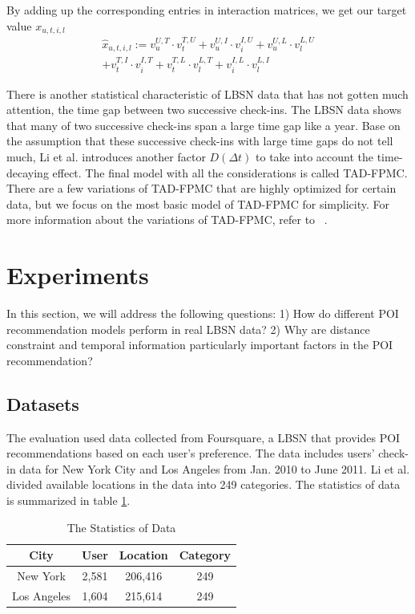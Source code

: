 \documentclass{sig-alternate}
\begin{document}
By adding up the corresponding entries in interaction matrices, we get our target value $x_{u,t,i,l}$
\begin{equation}
\begin{split}
\hat{x}_{u,t,i,l} := v_u^{U,T} \cdot v_t^{T,U} + v_u^{U,I} \cdot v_i^{I,U} + v_u^{U,L} \cdot v_l^{L,U}  \\
	                        + v_t^{T,I} \cdot v_i^{I,T} + v_t^{T,L} \cdot v_l^{L,T} + v_i^{I,L} \cdot v_l^{L,I}
\end{split}
\label{eq:TAD-FPMC}
\end{equation}

There is another statistical characteristic of LBSN data that has not gotten much attention, the time gap between 
two successive check-ins. The LBSN data shows that many of two successive check-ins span a large time gap 
like a year. Base on the assumption that these successive check-ins with large time gaps do not tell much, 
Li et al. \cite{Li:2017} introduces another factor $D(\Delta t)$ to take into account the time-decaying effect. 
The final model with all the considerations is called TAD-FPMC. There are a few variations of TAD-FPMC that 
are highly optimized for certain data, but we focus on the most basic model of TAD-FPMC for simplicity. 
For more information about the variations of TAD-FPMC, refer to ~\cite{Li:2017}.

\section{Experiments}
\label{sec:experiments}
In this section, we will address the following questions: 1) How do different POI recommendation 
models perform in real LBSN data? 2) Why are distance constraint and temporal information particularly important 
factors in the POI recommendation?

\subsection{Datasets}
\label{sec:datasets}
The evaluation used data collected from Foursquare, a LBSN that provides POI recommendations based on 
each user's preference. The data includes users' check-in data for New York City and Los Angeles from Jan. 
2010 to June 2011. Li et al. \cite{Li:2017} divided available locations in the data into 249 categories. 
The statistics of data is summarized in table \ref{tab:stat}. \cite{Li:2017}

\begin{table}[ht]
\centering
\caption{The Statistics of Data}
\bigskip
\label{tab:stat}
\begin{tabular}{|c|c|c|c|}
        \hline
        City & User & Location & Category \\
        \hline
        New York & 2,581 & 206,416 & 249 \\
        \hline
       Los Angeles & 1,604 & 215,614 & 249 \\
        \hline
\end{tabular}
\end{table}
\end{document}
